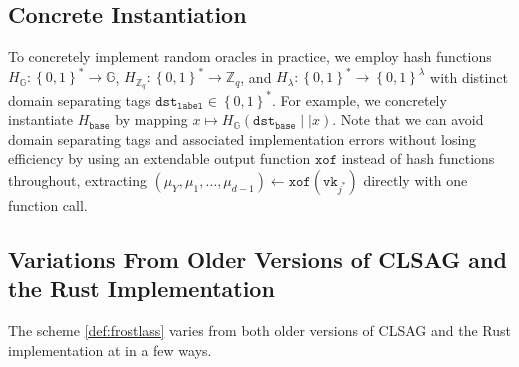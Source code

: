 \documentclass[11pt]{article}
\theoremstyle{definition}
\newcommand{\G}{\mathbb{G}}
\newcommand{\vk}{\texttt{vk}}
\newcommand{\dst}{\texttt{dst}}
\newcommand{\bitstrings}{\left\{0,1\right\}^*}
\newcommand{\Zq}{\mathbb{Z}_q}
\newcommand{\secpar}{\lambda}
\begin{document}
\subsection{Concrete Instantiation}\label{sec:concrete_instantiation}


To concretely implement random oracles in practice, we employ hash functions $H_{\G}: \bitstrings \to \G$, $H_{\Zq}:\bitstrings \to \Zq$, and $H_{\secpar}:\bitstrings \to \left\{0,1\right\}^\secpar$ with distinct domain separating tags $\dst_{\texttt{label}} \in \bitstrings$. For example, we concretely instantiate $H_{\texttt{base}}$ by mapping $x \mapsto H_{\G}(\dst_{\texttt{base}} \mid \mid x)$. Note that we can avoid domain separating tags and associated implementation errors without losing efficiency by using an extendable output function $\texttt{xof}$ instead of hash functions throughout, extracting $(\mu_Y, \mu_1, \ldots, \mu_{d-1}) \leftarrow \texttt{xof}(\vk_{j^*})$ directly with one function call.

\subsection{Variations From Older Versions of CLSAG and the Rust Implementation}\label{sec:variations_from_implem}

The scheme \cref{def:frostlass} varies from both older versions of CLSAG and the Rust implementation at \cite{SeraiRepo} in a few ways.
\end{document}
